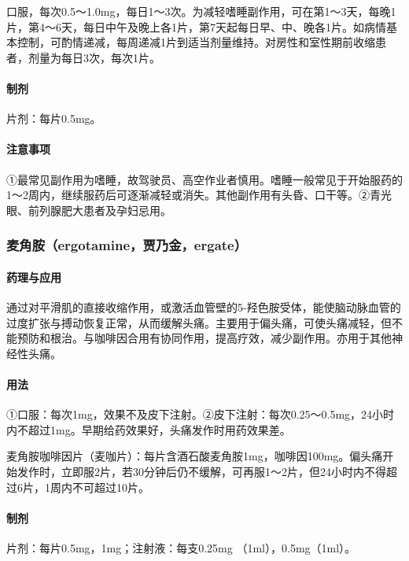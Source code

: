 口服，每次0.5～1.0mg，每日1～3次。为减轻嗜睡副作用，可在第1～3天，每晚1片，第4～6天，每日中午及晚上各1片，第7天起每日早、中、晚各1片。如病情基本控制，可酌情递减，每周递减1片到适当剂量维持。对房性和室性期前收缩患者，剂量为每日3次，每次1片。

\paragraph{制剂}

片剂：每片0.5mg。

\paragraph{注意事项}

①最常见副作用为嗜睡，故驾驶员、高空作业者慎用。嗜睡一般常见于开始服药的1～2周内，继续服药后可逐渐减轻或消失。其他副作用有头昏、口干等。②青光眼、前列腺肥大患者及孕妇忌用。

\subsubsection{麦角胺（ergotamine，贾乃金，ergate）}

\paragraph{药理与应用}

通过对平滑肌的直接收缩作用，或激活血管壁的5-羟色胺受体，能使脑动脉血管的过度扩张与搏动恢复正常，从而缓解头痛。主要用于偏头痛，可使头痛减轻，但不能预防和根治。与咖啡因合用有协同作用，提高疗效，减少副作用。亦用于其他神经性头痛。

\paragraph{用法}

①口服：每次1mg，效果不及皮下注射。②皮下注射：每次0.25～0.5mg，24小时内不超过1mg。早期给药效果好，头痛发作时用药效果差。

麦角胺咖啡因片（麦咖片）：每片含酒石酸麦角胺1mg，咖啡因100mg。偏头痛开始发作时，立即服2片，若30分钟后仍不缓解，可再服1～2片，但24小时内不得超过6片，1周内不可超过10片。

\paragraph{制剂}

片剂：每片0.5mg，1mg；注射液：每支0.25mg （1ml），0.5mg（1ml）。

